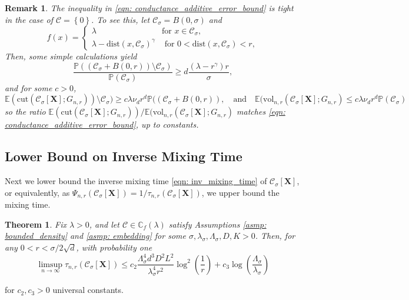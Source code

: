 \documentclass{article}
\newcommand{\set}[1]{\left\{#1\right\}}
\newcommand{\vol}{\mathrm{vol}}
\newcommand{\cut}{\mathrm{cut}}
\newcommand{\1}{\mathbf{1}}
\newcommand{\dist}{\mathrm{dist}}
\newcommand{\Xbf}{\mathbf{X}}
\newcommand{\Pbb}{\mathbb{P}}
\newcommand{\Cbb}{\mathbb{C}}
\newcommand{\Ebb}{\mathbb{E}}
\newcommand{\Cset}{\mathcal{C}}
\newcommand{\Csig}{\Cset_{\sigma}}
\theoremstyle{aldenthm}
\newtheorem{theorem}{Theorem}
\theoremstyle{aldenrmrk}
\newtheorem{remark}{Remark}
\begin{document}
\begin{remark}
The inequality in \eqref{eqn: conductance_additive_error_bound} is tight in the case of $\Cset = \set{0}$. To see this, let $\Csig = B(0,\sigma)$ and
$$
 f(x)  = \begin{cases}
   \lambda &\text{for $x \in \Csig$}, \\
   \lambda - \dist(x,\Csig)^{\gamma} & \text{ for $0 < \dist(x,\Csig) < r$}, 
\end{cases}
$$
Then, some simple calculations yield
\begin{equation*}
\frac{\Pbb((\Csig + B(0,r)) \setminus \Csig)}{\Pbb(\Csig)} \geq d\frac{(\lambda - r^{\gamma}) r}{\sigma},
\end{equation*}
and for some $c > 0$,
\begin{equation*}
\Ebb(\cut(\Csig[\Xbf]; G_{n,r})) \setminus \Csig) \geq c \lambda \nu_d r^d \Pbb((\Csig + B(0,r)), \quad \textrm{and} \quad \Ebb(\vol_{n,r}(\Csig[\Xbf]; G_{n,r}) \leq c \lambda \nu_d r^d \Pbb(\Csig)
\end{equation*}
so the ratio $\Ebb(\cut(\Csig[\Xbf]; G_{n,r})) / \Ebb(\vol_{n,r}(\Csig[\Xbf]; G_{n,r})$ matches \ref{eqn: conductance_additive_error_bound}, up to constants.


\end{remark}

\subsection{Lower Bound on Inverse Mixing Time}

Next we lower bound the inverse mixing time \eqref{eqn: inv_mixing_time} of $\Csig[\Xbf]$, or equivalently, as $\Psi_{n,r}(\Csig[\Xbf]) = 1/\tau_{n,r}(\Csig[\Xbf])$, we upper bound the mixing time.

\begin{theorem}
	\label{thm: mixing_time_upper_bound}
	Fix $\lambda > 0$, and let $\Cset \in \Cbb_f(\lambda)$ satisfy Assumptions \ref{asmp: bounded_density} and \ref{asmp: embedding} for some $\sigma, \lambda_{\sigma}, \Lambda_{\sigma}, D, K > 0$. Then, for any $0 < r < \sigma/2\sqrt{d}$, with probability one
	\begin{equation*}
	\limsup_{n \to \infty}\tau_{n,r}(\Csig[\Xbf]) \leq c_2 \frac{\Lambda_{\sigma}^4 d^3 D^2 L^2}{\lambda_{\sigma}^4 r^2} \log^2\left(\frac{1}{r}\right) + c_3 \log\left(\frac{\Lambda_{\sigma}}{\lambda_{\sigma}}\right)
	\end{equation*}
\end{theorem}
for $c_2,c_3 > 0$ universal constants. 
\end{document}
